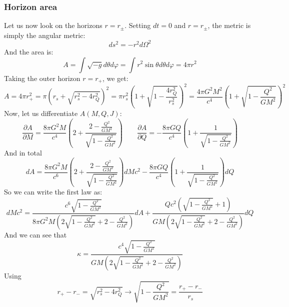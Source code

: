 \documentclass{article}
\begin{document}
\subsubsection{Horizon area}
Let us now look on the horizons $r = r_{\pm}$. Setting $dt = 0$ and $r = r_{\pm}$, the metric is simply the angular metric:
\begin{equation}
    ds^2 = - r^2d\Omega^2
\end{equation}
And the area is:
\begin{equation}
    A = \int \sqrt{-g}d\theta d\varphi = \int r^2 \sin\theta d\theta d\varphi = 4\pi r^2
\end{equation}
Taking the outer horizon $r = r_{+}$, we get:
\begin{equation}
    A = 4\pi r_{+}^2 = \pi \left(r_s + \sqrt{r_s^2 - 4r_Q^2}\right)^2 = \pi r_s^2 \left(
        1 + \sqrt{1 - \frac{4r_Q^2}{r_s^2}}
    \right)^2 = \frac{4\pi G^2M^2}{c^4} \left(
        1 + \sqrt{1 - \frac{Q^2}{GM^2}}
    \right)^2
\end{equation}
Now, let us differentiate $A(M, Q, J)$:
\begin{equation}
    \frac{\partial A}{\partial M} = 
    \frac{8\pi G^2M}{c^4}
    \left(
        2 +
        \frac{2 - \frac{Q^2}{GM^2}}{\sqrt{1 - \frac{Q^2}{GM^2}}}
    \right)
    \qquad
    \frac{\partial A}{\partial Q} = -\frac{8\pi GQ}{c^4}\left(
        1 + \frac{1}{\sqrt{1 - \frac{Q^2}{GM^2}}}
    \right)
\end{equation}
And in total
\begin{equation}
    dA = \frac{8\pi G^2M}{c^6}
    \left(
        2 + \frac{2 - \frac{Q^2}{GM^2}}{\sqrt{1 - \frac{Q^2}{GM^2}}}
    \right)dMc^2 - \frac{8\pi GQ}{c^4}\left(
        1 + \frac{1}{\sqrt{1 - \frac{Q^2}{GM^2}}}
    \right) dQ
\end{equation}
So we can write the first law as:
\begin{equation}
    dMc^2 = \frac{c^6\sqrt{1 - \frac{Q^2}{GM^2}}}{8\pi G^2M
    \left(
        2\sqrt{1 - \frac{Q^2}{GM^2}} + 2 - \frac{Q^2}{GM^2}
    \right)}dA +
    \frac{Qc^2\left(
        \sqrt{1 - \frac{Q^2}{GM^2}} + 1
    \right)}{GM
    \left(
        2\sqrt{1 - \frac{Q^2}{GM^2}} + 2 - \frac{Q^2}{GM^2}
    \right)} dQ 
\end{equation}
And we can see that
\begin{equation}
    \kappa = \frac{c^4\sqrt{1 - \frac{Q^2}{GM^2}}}{GM
    \left(
        2\sqrt{1 - \frac{Q^2}{GM^2}} + 2 - \frac{Q^2}{GM^2}
    \right)}
\end{equation}
Using
\begin{equation}
    r_{+} - r_{-} = \sqrt{r_s^2 - 4r_Q^2}
    \rightarrow
    \sqrt{1 - \frac{Q^2}{GM^2}} = \frac{r_{+} - r_{-}}{r_s}
\end{equation}
\end{document}
